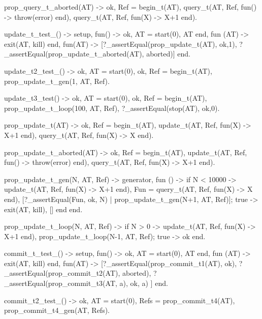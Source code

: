 \documentclass[11pt]{article}
\renewenvironment{verbatim}{}{}
\begin{document}
\begin{verbatim}
prop_query_t_aborted(AT) ->
    {ok, Ref} = begin_t(AT),
    query_t(AT, Ref, fun() -> throw(error) end),
    query_t(AT, Ref, fun(X) -> X+1 end).


%%% Test update_t %%%
update_t_test_() -> 
    {setup,
    fun() -> {ok, AT} = start(0), AT end,
    %fun () -> {ok, AT} = start(0) end,
    fun (AT) -> exit(AT, kill) end,
    fun(AT) ->
    [?_assertEqual(prop_update_t(AT), {ok,1}), %Test transaction state is updated
     ?_assertEqual(prop_update_t_aborted(AT), aborted)] %Test transaction is aborted with failed update.
    end}.

update_t2_test_() -> %Test state is continous updated
    {ok, AT} = start(0),
    {ok, Ref} = begin_t(AT),
    prop_update_t_gen(1, AT, Ref).    

update_t3_test() -> %Server state should not be touched by update_t
    {ok, AT} = start(0),
    {ok, Ref} = begin_t(AT),
    prop_update_t_loop(100, AT, Ref),
    ?_assertEqual(stop(AT), {ok,0}).

%
prop_update_t(AT) ->
    {ok, Ref} = begin_t(AT),
    update_t(AT, Ref, fun(X) -> X+1 end),
    query_t(AT, Ref, fun(X) -> X end).


prop_update_t_aborted(AT) ->
    {ok, Ref} = begin_t(AT),
    update_t(AT, Ref, fun() -> throw(error) end),
    query_t(AT, Ref, fun(X) -> X+1 end).


prop_update_t_gen(N, AT, Ref) -> 
   {generator,
    fun () ->
        if N < 10000 ->
                update_t(AT, Ref, fun(X) -> X+1 end),
                Fun = query_t(AT, Ref, fun(X) -> X end), %Dummy function
                [?_assertEqual(Fun, {ok, N})
                 | prop_update_t_gen(N+1, AT, Ref)];
           true ->
                exit(AT, kill),
                []
        end
    end}.

prop_update_t_loop(N, AT, Ref) ->
    if N > 0 ->
           update_t(AT, Ref, fun(X) -> X+1 end),
           prop_update_t_loop(N-1, AT, Ref);
       true -> ok
    end.


%%% Test commit_t. Assumes update_t works %%%
commit_t_test_() -> 
    {setup,
    fun() -> {ok, AT} = start(0), AT end,
    %fun () -> {ok, AT} = start(0) end,
    fun (AT) -> exit(AT, kill) end,
    fun(AT) ->
    [?_assertEqual(prop_commit_t1(AT), ok), %Test commit result
     ?_assertEqual(prop_commit_t2(AT), aborted), %Test commit result
     ?_assertEqual(prop_commit_t3(AT, a), {ok, a}) %Test if state is commited
    ]
    end}.

commit_t2_test_() -> %Tests all trans are aborted when commit happens
    {ok, AT} = start(0),
    Refs = prop_commit_t4(AT),
    prop_commit_t4_gen(AT, Refs).


\end{verbatim}
\end{document}
